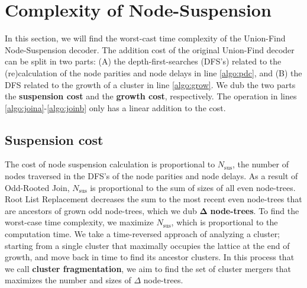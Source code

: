 
\section{Complexity of Node-Suspension}\label{sec:complexity}

In this section, we will find the worst-cast time complexity of the Union-Find Node-Suspension decoder. The addition cost of the original Union-Find decoder can be split in two parts: (A) the depth-first-searches (DFS's) related to the (re)calculation of the node parities and node delays in line \ref{algo:pdc}, and (B) the DFS related to the growth of a cluster in line \ref{algo:grow}. We dub the two parts the \textbf{suspension cost} and the \textbf{growth cost}, respectively. The  operation in lines \ref{algo:joina}-\ref{algo:joinb} only has a linear addition to the cost.

\subsection{Suspension cost}\label{sec:suscomplexity}

The cost of node suspension calculation is proportional to $N_{\text{sus}}$, the number of nodes traversed in the DFS's of the node parities and node delays. As a result of Odd-Rooted Join, $N_{\text{sus}}$ is proportional to the sum of sizes of all even node-trees. Root List Replacement decreases the sum to the most recent even node-trees that are ancestors of grown odd node-trees, which we dub $\mathbf{\Delta}$ \textbf{node-trees}. To find the worst-case time complexity, we maximize $N_{\text{sus}}$, which is proportional to the computation time. We take a time-reversed approach of analyzing a cluster; starting from a single cluster that maximally occupies the lattice at the end of growth, and move back in time to find its ancestor clusters. In this process that we call \textbf{cluster fragmentation}, we aim to find the set of cluster mergers that maximizes the number and sizes of $\Delta$ node-trees. 





